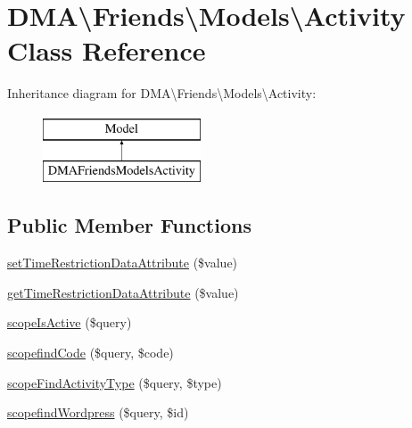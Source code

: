 \hypertarget{classDMA_1_1Friends_1_1Models_1_1Activity}{\section{D\+M\+A\textbackslash{}Friends\textbackslash{}Models\textbackslash{}Activity Class Reference}
\label{classDMA_1_1Friends_1_1Models_1_1Activity}
}
Inheritance diagram for D\+M\+A\textbackslash{}Friends\textbackslash{}Models\textbackslash{}Activity\+:\begin{figure}[H]
\begin{center}
\leavevmode
\includegraphics[height=2.000000cm]{dc/d8c/classDMA_1_1Friends_1_1Models_1_1Activity}
\end{center}
\end{figure}
\subsection*{Public Member Functions}
\begin{DoxyCompactItemize}
\item 
\hyperlink{classDMA_1_1Friends_1_1Models_1_1Activity_ade0ffca24448c217def365d104e52866}{set\+Time\+Restriction\+Data\+Attribute} (\$value)
\item 
\hyperlink{classDMA_1_1Friends_1_1Models_1_1Activity_a98a904c739aca30f2a26152a481164b6}{get\+Time\+Restriction\+Data\+Attribute} (\$value)
\item 
\hyperlink{classDMA_1_1Friends_1_1Models_1_1Activity_acd3f12824d95be07b5221cdc9d64abf7}{scope\+Is\+Active} (\$query)
\item 
\hyperlink{classDMA_1_1Friends_1_1Models_1_1Activity_a9bb36aab36ff22a29b2a594617dd591c}{scopefind\+Code} (\$query, \$code)
\item 
\hyperlink{classDMA_1_1Friends_1_1Models_1_1Activity_aa17825817b73d3073e37d5e2c0933003}{scope\+Find\+Activity\+Type} (\$query, \$type)
\item 
\hyperlink{classDMA_1_1Friends_1_1Models_1_1Activity_a5a533a3f638f99d1dd0a8e0550def49e}{scopefind\+Wordpress} (\$query, \$id)
\end{DoxyCompactItemize}
